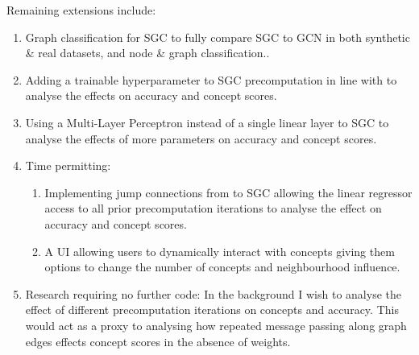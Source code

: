 Remaining extensions include:
\begin{enumerate}[nolistsep]
    \item Graph classification for SGC to fully compare SGC to GCN in both synthetic \& real datasets, and node \& graph classification..
    \item Adding a trainable hyperparameter to SGC precomputation in line with \cite{chanpuriya2022simplified} to analyse the effects on accuracy and concept scores.
    \item Using a Multi-Layer Perceptron instead of a single linear layer to SGC to analyse the effects of more parameters on accuracy and concept scores.
    \item Time permitting: 
    \begin{enumerate}[nolistsep]
        \item Implementing jump connections from \cite{xu2018representation} to SGC allowing the linear regressor access to all prior precomputation iterations to analyse the effect on accuracy and concept scores.
        \item A UI allowing users to dynamically interact with concepts giving them options to change the number of concepts and neighbourhood influence.
    \end{enumerate}
    \item Research requiring no further code: In the background I wish to analyse the effect of different precomputation iterations on concepts and accuracy. This would act as a proxy to analysing how repeated message passing along graph edges effects concept scores in the absence of weights.
\end{enumerate}

